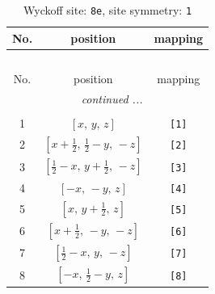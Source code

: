 \documentclass[fleqn,8pt]{jsarticle}
\begin{document}
\renewcommand{\arraystretch}{1.2}
\begin{longtable}{ccc}
\caption{Wyckoff site: {\tt 8e}, site symmetry: {\tt 1}}
 \\
 \hline \hline
No. & position & mapping \\ \hline \endfirsthead

\multicolumn{2}{l}{\tablename\ \thetable{}} \\
 \hline \hline
No. & position & mapping \\ \hline \endhead

 \hline \hline
\multicolumn{2}{r}{\footnotesize\it continued ...} \\ \endfoot

 \hline \hline
\multicolumn{2}{r}{} \\ \endlastfoot

1 & $\left[ x,\, y,\, z \right]$ & {\tt [1]} \\ \hline
2 & $\left[ x + \frac{1}{2},\, \frac{1}{2} - y,\, - z \right]$ & {\tt [2]} \\ \hline
3 & $\left[ \frac{1}{2} - x,\, y + \frac{1}{2},\, - z \right]$ & {\tt [3]} \\ \hline
4 & $\left[ - x,\, - y,\, z \right]$ & {\tt [4]} \\ \hline
5 & $\left[ x,\, y + \frac{1}{2},\, z \right]$ & {\tt [5]} \\ \hline
6 & $\left[ x + \frac{1}{2},\, - y,\, - z \right]$ & {\tt [6]} \\ \hline
7 & $\left[ \frac{1}{2} - x,\, y,\, - z \right]$ & {\tt [7]} \\ \hline
8 & $\left[ - x,\, \frac{1}{2} - y,\, z \right]$ & {\tt [8]} \\
\end{longtable}
\end{document}
